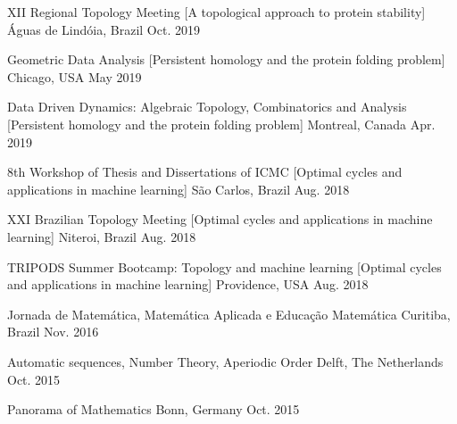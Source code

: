 
\begin{cvhonors}

\cvhonor
  {XII Regional Topology Meeting} %
  [A topological approach to protein stability] %
  {Águas de Lindóia, Brazil} %
  {Oct. 2019} %


\cvhonor
  {Geometric Data Analysis} %
  [Persistent homology and the protein folding problem] %
  {Chicago, USA} %
  {May 2019} %

\cvhonor
  {Data Driven Dynamics: Algebraic Topology, Combinatorics and Analysis} %
  [Persistent homology and the protein folding problem] %
  {Montreal, Canada} %
  {Apr. 2019} %

\cvhonor
  {8th Workshop of Thesis and Dissertations of ICMC} %
  [Optimal cycles and applications in machine learning] %
  {São Carlos, Brazil} %
  {Aug. 2018} %

\cvhonor
  {XXI Brazilian Topology Meeting} %
  [Optimal cycles and applications in machine learning] %
  {Niteroi, Brazil} %
  {Aug. 2018} %

\cvhonor
  {TRIPODS Summer Bootcamp: Topology and machine learning} %
  [Optimal cycles and applications in machine learning] %
  {Providence, USA} %
  {Aug. 2018} %

\cvhonor
  {Jornada de Matemática, Matemática Aplicada e Educação Matemática} %
  {Curitiba, Brazil} %
  {Nov. 2016} %

\cvhonor
  {Automatic sequences, Number Theory, Aperiodic Order} %
  {Delft, The Netherlands} %
  {Oct. 2015} %

\cvhonor
  {Panorama of Mathematics} %
  {Bonn, Germany} %
  {Oct. 2015} %

\end{cvhonors}
